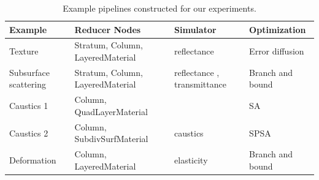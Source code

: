 \documentclass[annual]{acmsiggraph}
\begin{document}
\begin{table}
\centering
\begin{tabular}{llll}  %
\hline
\textbf{Example} & \textbf{Reducer Nodes} & \textbf{Simulator} & \textbf{Optimization}\\
\hline
Texture& Stratum, Column, LayeredMaterial & reflectance & Error diffusion \\
Subsurface scattering& Stratum, Column, LayeredMaterial & reflectance , transmittance & Branch and bound\\
Caustics 1 & Column, QuadLayerMaterial & & SA \\
Caustics 2 & Column, SubdivSurfMaterial & caustics & SPSA \\
Deformation & Column, LayeredMaterial& elasticity & Branch and bound\\
\hline
\end{tabular}
\caption{Example pipelines constructed for our experiments.}
\label{tab:example}
\end{table}
\end{document}
